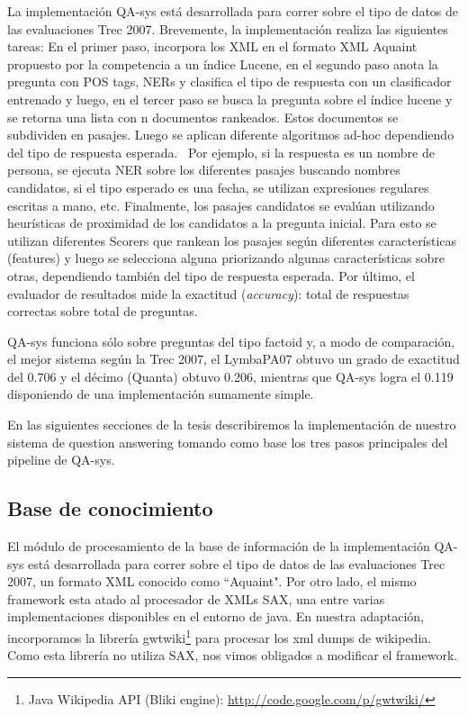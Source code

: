 La implementación QA-sys está desarrollada para correr sobre
el tipo de datos de las evaluaciones Trec 2007. 
Brevemente, la implementación realiza las siguientes tareas:
En el primer paso, incorpora los XML en el formato XML Aquaint propuesto por la competencia a un índice Lucene, en
el segundo paso anota la pregunta con POS tags, NERs y
clasifica el tipo de respuesta con un clasificador entrenado y luego,
en el tercer paso se busca la pregunta sobre el índice lucene y se
retorna una lista con n documentos rankeados. Estos documentos se
subdividen en pasajes. Luego se aplican diferente algoritmos ad-hoc
dependiendo del tipo de respuesta esperada. \ Por ejemplo, si la
respuesta es un nombre de persona, se ejecuta NER sobre los diferentes
pasajes buscando nombres candidatos, si el tipo esperado es una fecha,
se utilizan expresiones regulares escritas a mano, etc. Finalmente, los
pasajes candidatos se evalúan utilizando heurísticas de proximidad
de los candidatos a la pregunta inicial. Para esto se utilizan
diferentes Scorers que rankean los pasajes según diferentes
características (features) y luego se selecciona alguna priorizando
algunas características sobre otras, dependiendo también del tipo
de respuesta esperada. Por último, el evaluador de resultados mide la
exactitud (\textit{accuracy}): total de respuestas correctas sobre
total de preguntas. 

QA-sys funciona sólo sobre preguntas del tipo
factoid y, a modo de comparación, el mejor sistema según la Trec
2007, el LymbaPA07 obtuvo un grado de exactitud del 0.706 y el décimo
(Quanta) obtuvo 0.206, mientras que QA-sys logra el 0.119 disponiendo de una implementación sumamente simple.

En las siguientes secciones de la tesis describiremos la implementación de nuestro sistema de question answering tomando como base los tres pasos principales del pipeline de QA-sys. 

\subsection{Base de conocimiento}
El módulo de procesamiento de la base de información de la implementación QA-sys está desarrollada para correr sobre el tipo de datos de las evaluaciones Trec 2007, un formato XML conocido como ``Aquaint". Por otro lado, el mismo framework esta atado al procesador de XMLs SAX, una entre varias implementaciones disponibles en el entorno de java. En nuestra adaptación, incorporamos la librería gwtwiki\footnote{Java Wikipedia API (Bliki engine): \url{http://code.google.com/p/gwtwiki/}} para procesar los xml dumps de wikipedia. Como esta librería no utiliza SAX, nos vimos obligados a modificar el framework. 

